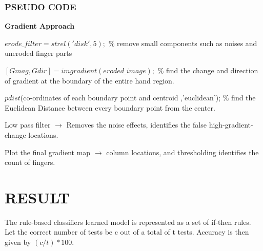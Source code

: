 \documentclass[conference]{IEEEtran}
\begin{document}
\subsubsection{PSEUDO CODE}
\textbf{Gradient Approach}
\begin{flushleft}


$erode\_filter= strel('disk',5);$ \% remove small components such as noises and uneroded finger parts
 
$[Gmag, Gdir] = imgradient(eroded \_ image); $ \% find the change and direction of gradient at the boundary of the entire hand region. 

$pdist$(co-ordinates of each boundary point and centroid ,'euclidean'); \% find the Euclidean Distance between every boundary point from the center.

Low pass filter $\rightarrow$ Removes the noise effects, identifies the false high-gradient-change locations.

Plot the final gradient map $\rightarrow$ column locations, and thresholding identifies the count of fingers.
\end{flushleft}
\section{RESULT}
The rule-based classifiers learned model is represented as a set of if-then rules. Let the correct number of tests be c out of a total of t tests.
Accuracy is then given by $(c/t)*100$.
\end{document}
